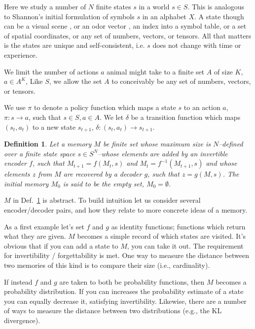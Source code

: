 \documentclass[9pt,twocolumn,twoside]{pnas-new}
\newtheorem{definition}{Definition}
\begin{document}
Here we study a number of $N$ finite states $s$ in a world $s \in S$. This is analogous to Shannon's initial formulation of symbols $s$ in an alphabet $X$. A state though can be a visual scene \cite{Mnih2015}, or an odor vector \cite{Dasgupta2017,Calhoun2014}, an index into a symbol table, or a set of spatial coordinates, or any set of numbers, vectors, or tensors. All that matters is the states are unique and self-consistent, i.e. $s$ does not change with time or experience. 

We limit the number of actions $a$ animal might take to a finite set $A$ of size $K$, $a \in A^K$, Like $S$, we allow the set $A$ to conceivably be any set of numbers, vectors, or tensors.

We use $\pi$ to denote a policy function which maps a state $s$ to an action $a$, $\pi : s \rightarrow a$, such that $s \in S, a \in A$. We let $\delta$ be a transition function which maps $(s_{t},a_t)$ to a new state $s_{t+1}$, $\delta : (s_{t}, a_t) \rightarrow s_{t+1}$.


\begin{definition}
    \label{def:memory}
    Let a memory $M$ be finite set whose maximum size is $N$--defined over a finite state space $s \in S^N$--whose elements are added by an invertible encoder $f$, such that $M_{t+1} = f(M_{t}, s)$ and $M_{t} = f^{-1}(M_{t+1}, s)$ and whose elements $z$ from $M$ are recovered by a decoder $g$, such that $z = g(M, s)$. The initial memory $M_{0}$ is said to be the empty set, $M_{0} = \emptyset$.
\end{definition}

$M$ in Def.~\ref{def:memory} is abstract. To build intuition let us consider several encoder/decoder pairs, and how they relate to more concrete ideas of a memory.

As a first example let's set $f$ and $g$ as identity functions; functions which return what they are given. $M$ becomes a simple record of which states are visited. It's obvious that if you can add a state to $M$, you can take it out. The requirement for invertibility / forgettability is met. One way to measure the distance between two memories of this kind is to compare their size (i.e., cardinality).

If instead $f$ and $g$ are taken to both be probability functions, then $M$ becomes a probability distribution. If you can increases the probability estimate of a state you can equally decrease it, satisfying invertibility. Likewise, there are a number of ways to measure the distance between two distributions (e.g., the KL divergence).
\end{document}
